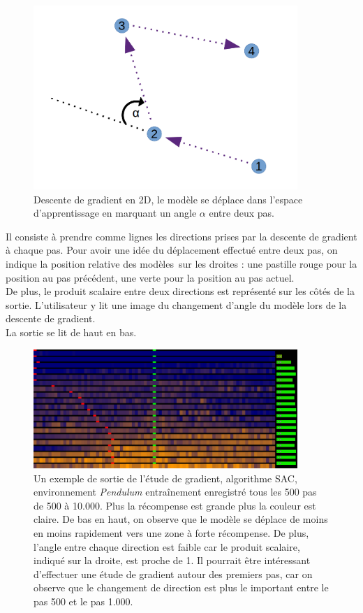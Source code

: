 \documentclass[12pt]{article}
\begin{document}
\begin{figure}[htp]
    \centering
    \includegraphics[width=10cm]{Images/gradientStudy_dessus}
    \caption{Descente de gradient en 2D, le modèle se déplace dans l'espace d'apprentissage en marquant un angle $\alpha$ entre deux pas.}
    \label{fig:gradientStudyAbove}
\end{figure}

Il consiste à prendre comme lignes les directions prises par la descente de gradient à chaque pas. Pour avoir une idée du déplacement effectué entre deux pas, on indique la position relative des modèles sur les droites : une pastille rouge pour la position au pas précédent, une verte pour la position au pas actuel. \\

De plus, le produit scalaire entre deux directions est représenté sur les côtés de la sortie. L'utilisateur y lit une image du changement d'angle du modèle lors de la descente de gradient. \\

La sortie se lit de haut en bas. \\

\begin{figure}[htp]
    \centering
    \includegraphics[width=10cm]{Images/gradientStudy}
    \caption{Un exemple de sortie de l'étude de gradient, algorithme SAC, environnement \emph{Pendulum} entraînement enregistré tous les 500 pas de 500 à 10.000. Plus la récompense est grande plus la couleur est claire. De bas en haut, on observe que le modèle se déplace de moins en moins rapidement vers une zone à forte récompense. De plus, l'angle entre chaque direction est faible car le produit scalaire, indiqué sur la droite, est proche de 1. Il pourrait être intéressant d'effectuer une étude de gradient autour des premiers pas, car on observe que le changement de direction est plus le important entre le pas 500 et le pas 1.000.}
    \label{fig:gradientStudy}
\end{figure}
\end{document}
